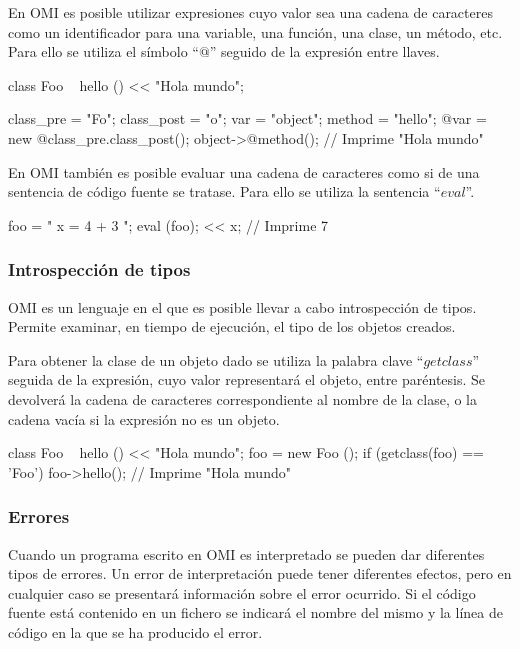 En OMI es posible utilizar expresiones cuyo valor sea una cadena de caracteres como un identificador para una variable, una función, una clase, un método, etc. Para ello se 
utiliza el símbolo ``$@$'' seguido de la expresión entre llaves. \\

\begin{myverbatim}
   class Foo {
      ~ hello () {
         << "Hola mundo";
      }
   }
   
   class_pre = "Fo";
   class_post = "o";
   var = "object";
   method = "hello";
   @{var} = new @{class_pre.class_post}();
   object->@{method}(); // Imprime "Hola mundo"
\end{myverbatim}

En OMI también es posible evaluar una cadena de caracteres como si de una sentencia de código fuente se tratase. Para ello se utiliza la sentencia ``$eval$''. \\

\begin{myverbatim}
   foo = " x = 4 + 3 ";
   eval (foo);
   << x; // Imprime 7
\end{myverbatim}

\subsubsection{Introspección de tipos}

OMI es un lenguaje en el que es posible llevar a cabo introspección de tipos. Permite examinar, en tiempo de ejecución, el tipo de los objetos creados. 

Para obtener la clase de un objeto dado se utiliza la palabra clave ``$getclass$'' seguida de la expresión, cuyo valor representará el objeto, entre paréntesis. Se devolverá
la cadena de caracteres correspondiente al nombre de la clase, o la cadena vacía si la expresión no es un objeto. \\

\begin{myverbatim}
   class Foo {
      ~ hello () {
         << "Hola mundo";
      }
   }
   foo = new Foo ();
   if (getclass(foo) == 'Foo')
      foo->hello(); // Imprime "Hola mundo"
\end{myverbatim}

\subsubsection{Errores} \label{sec:error}
Cuando un programa escrito en OMI es interpretado se pueden dar diferentes tipos de errores. Un error de interpretación 
puede tener diferentes efectos, pero en cualquier caso se presentará información sobre el error ocurrido. Si el código fuente está contenido en un fichero 
se indicará el nombre del mismo y la línea de código en la que se ha producido el error. 

